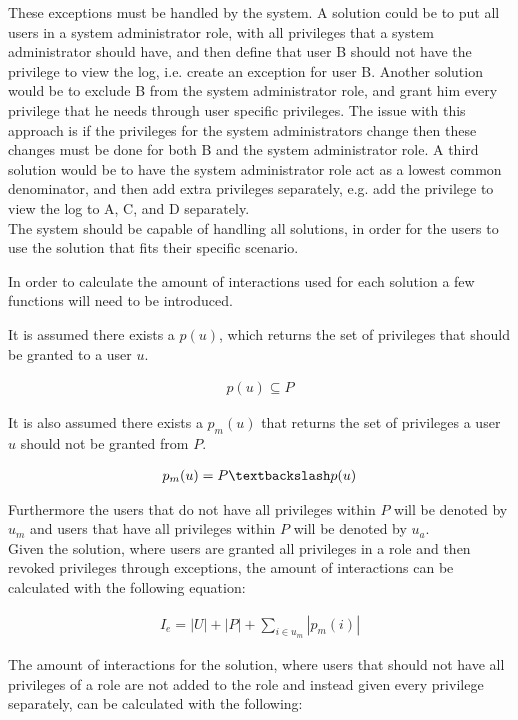 These exceptions must be handled by the system.
A solution could be to put all users in a system administrator role, with all privileges that a system administrator should have, and then define that user B should not have the privilege to view the log, i.e. create an exception for user B.
Another solution would be to exclude B from the system administrator role, and grant him every privilege that he needs through user specific privileges.
The issue with this approach is if the privileges for the system administrators change then these changes must be done for both B and the system administrator role.
A third solution would be to have the system administrator role act as a lowest common denominator, and then add extra privileges separately, e.g. add the privilege to view the log to A, C, and D separately. \\

The system should be capable of handling all solutions, in order for the users to use the solution that fits their specific scenario.

In order to calculate the amount of interactions used for each solution a few functions will need to be introduced.

It is assumed there exists a $p(u)$, which returns the set of privileges that should be granted to a user $u$.

\begin{align}
p(u) \subseteq P
\end{align}

It is also assumed there exists a $p_{m}(u)$ that returns the set of privileges a user $u$ should not be granted from $P$.

\begin{align}
p_{m}(u)=P\textbackslash p(u)
\end{align}

Furthermore the users that do not have all privileges within $P$ will be denoted by $u_{m}$ and users that have all privileges within $P$ will be denoted by $u_{a}$. \\

Given the solution, where users are granted all privileges in a role and then revoked privileges through exceptions, the amount of interactions can be calculated with the following equation:

\begin{align}
I_{e} = |U| + |P| + \sum_{i \in u_{m}} |p_{m}(i)|
\end{align}

The amount of interactions for the solution, where users that should not have all privileges of a role are not added to the role and instead given every privilege separately, can be calculated with the following:

